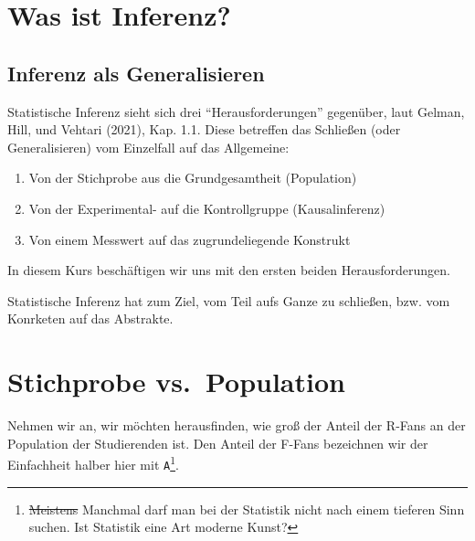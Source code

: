 \documentclass[
  a4paper,
  DIV=11]{scrreprt}
\providecommand{\tightlist}{%
  \setlength{\itemsep}{0pt}\setlength{\parskip}{0pt}}\usepackage{longtable,booktabs,array}
\theoremstyle{definition}
\theoremstyle{remark}
\begin{document}
\hypertarget{was-ist-inferenz}{%
\section{Was ist Inferenz?}\label{was-ist-inferenz}}

\hypertarget{inferenz-als-generalisieren}{%
\subsection{Inferenz als
Generalisieren}\label{inferenz-als-generalisieren}}

Statistische Inferenz sieht sich drei ``Herausforderungen'' gegenüber,
laut Gelman, Hill, und Vehtari (2021), Kap. 1.1. Diese betreffen das
Schließen (oder Generalisieren) vom Einzelfall auf das Allgemeine:

\begin{enumerate}
\def\labelenumi{\arabic{enumi}.}
\tightlist
\item
  Von der Stichprobe aus die Grundgesamtheit (Population)
\item
  Von der Experimental- auf die Kontrollgruppe (Kausalinferenz)
\item
  Von einem Messwert auf das zugrundeliegende Konstrukt
\end{enumerate}

In diesem Kurs beschäftigen wir uns mit den ersten beiden
Herausforderungen.

\begin{tcolorbox}[enhanced jigsaw, colframe=quarto-callout-important-color-frame, title=\textcolor{quarto-callout-important-color}{\faExclamation}\hspace{0.5em}{Wichtig}, breakable, leftrule=.75mm, coltitle=black, toptitle=1mm, bottomrule=.15mm, bottomtitle=1mm, opacityback=0, arc=.35mm, rightrule=.15mm, left=2mm, colbacktitle=quarto-callout-important-color!10!white, opacitybacktitle=0.6, toprule=.15mm, titlerule=0mm, colback=white]
Statistische Inferenz hat zum Ziel, vom Teil aufs Ganze zu schließen,
bzw. vom Konrketen auf das Abstrakte.
\end{tcolorbox}

\hypertarget{stichprobe-vs.-population}{%
\section{Stichprobe vs.~Population}\label{stichprobe-vs.-population}}

Nehmen wir an, wir möchten herausfinden, wie groß der Anteil der R-Fans
an der Population der Studierenden ist. Den Anteil der F-Fans bezeichnen
wir der Einfachheit halber hier mit \texttt{A}\footnote{\sout{Meistens}
  Manchmal darf man bei der Statistik nicht nach einem tieferen Sinn
  suchen. Ist Statistik eine Art moderne Kunst?}.
\end{document}
